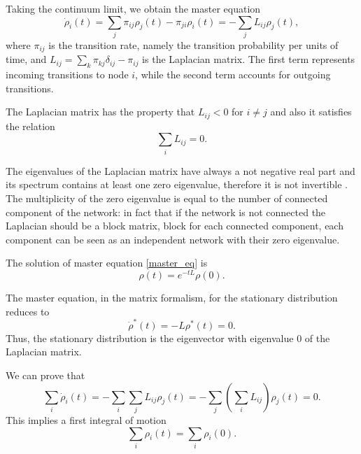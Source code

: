 Taking the continuum limit, we obtain the master equation \cite{Classic_random_walk}
\begin{equation}\label{master_eq}
    \dot \rho_i(t) = \sum_j \pi_{ij}\rho_j(t) - \pi_{ji}\rho_i(t) = - \sum_j L_{ij} \rho_j(t),
\end{equation}
where $\pi_{ij}$ is the transition rate, namely the transition probability per units of time, and $L_{ij} = \sum_k \pi_{kj}\delta_{ij} -\pi_{ij} $ is the Laplacian matrix.
The first term represents incoming transitions to node $i$, while the second term accounts for outgoing transitions.

The Laplacian matrix has the property that $L_{ij} < 0 $ for $i \neq j$ and also it satisfies the relation
\begin{equation}
    \sum_i L_{ij} = 0 .
\end{equation} 

The eigenvalues of the Laplacian matrix have always a not negative real part and its spectrum contains at least one zero eigenvalue, therefore it is not invertible \cite{Boccaletti}. The multiplicity of the zero eigenvalue is equal to the number of connected component of the network: in fact that if the network is not connected the Laplacian should be a block matrix,  block for each connected component, each component can be seen as an independent network with their zero eigenvalue.

The solution of master equation \eqref{master_eq} is
\begin{equation}\label{random_walk_solution}
    \rho(t) = e^{-tL}\rho(0).
\end{equation}

The master equation, in the matrix formalism, for the stationary distribution reduces to 
\begin{equation}\label{stationary_distribution}
    \dot \rho^*(t) = -L \rho^*(t) = 0 . 
\end{equation}
Thus, the stationary distribution is the eigenvector with eigenvalue $0$ of the Laplacian matrix. 

We can prove that
\begin{equation}
    \sum_i \dot\rho_i(t) = - \sum_i \sum_j L_{ij} \rho_j(t) = - \sum_j \left(\sum_i L_{ij}\right) \rho_j(t) = 0 .
\end{equation}
This implies a first integral of motion 
\begin{equation}
    \sum_i \rho_i(t) = \sum_i \rho_i(0) .
\end{equation}

